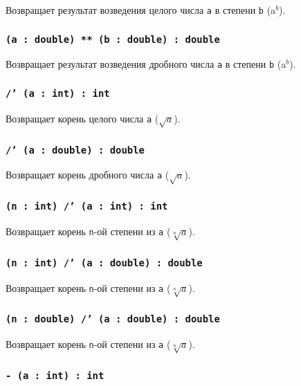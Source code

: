 Возвращает результат возведения целого числа \texttt{a} в степени \texttt{b} (a$^b$).

\subsubsection{\texttt{(a : double) ** (b : double) : double}}

Возвращает результат возведения дробного числа \texttt{a} в степени \texttt{b} (a$^b$).

\subsubsection{\texttt{/' (a : int) : int}}

Возвращает корень целого числа \texttt{a} ($\sqrt{a}$).

\subsubsection{\texttt{/' (a : double) : double}}

Возвращает корень дробного числа \texttt{a} ($\sqrt{a}$).

\subsubsection{\texttt{(n : int) /' (a : int) : int}}

Возвращает корень \texttt{n}-ой степени из \texttt{a} ($\sqrt[n]{a}$).

\subsubsection{\texttt{(n : int) /' (a : double) : double}}

Возвращает корень \texttt{n}-ой степени из \texttt{a} ($\sqrt[n]{a}$).

\subsubsection{\texttt{(n : double) /' (a : double) : double}}

Возвращает корень \texttt{n}-ой степени из \texttt{a} ($\sqrt[n]{a}$).


\subsubsection{\texttt{- (a : int) : int}}

